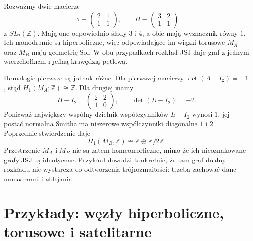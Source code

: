 \begin{przyklad}
\label{ex:tg-jsj-same-graph-different-h1}
Rozważmy dwie macierze
\[
A=\begin{pmatrix}2&1\\1&1\end{pmatrix},
\qquad
B=\begin{pmatrix}3&2\\1&1\end{pmatrix}
\]
z $SL_2(\mathbb Z)$.
Mają one odpowiednio ślady $3$ i $4$,
a obie mają wyznacznik równy $1$.
Ich monodromie są hiperboliczne,
więc odpowiadające im wiązki torusowe
$M_A$ oraz $M_B$ mają geometrię Sol.
W obu przypadkach rozkład JSJ
daje graf z jednym wierzchołkiem
i jedną krawędzią pętlową.

Homologie pierwsze są jednak różne.
Dla pierwszej macierzy $\det(A-I_2)=-1$,
stąd $H_1(M_A;\mathbb Z)\cong\mathbb Z$.
Dla drugiej mamy
\[
B-I_2=\begin{pmatrix}2&2\\1&0\end{pmatrix},
\qquad
\det(B-I_2)=-2.
\]
Ponieważ największy wspólny dzielnik
współczynników $B-I_2$ wynosi $1$,
jej postać normalna Smitha ma
niezerowe współczynniki diagonalne
$1$ i $2$. Poprzednie stwierdzenie daje
\[
H_1(M_B;\mathbb Z)\cong
\mathbb Z\oplus\mathbb Z/2\mathbb Z.
\]
Przestrzenie $M_A$ i $M_B$ nie są
zatem homeomorficzne, mimo że
ich nieoznakowane grafy JSJ są identyczne.
Przykład dowodzi konkretnie,
że sam graf dualny rozkładu
nie wystarcza do odtworzenia
trójrozmaitości: trzeba zachować
dane monodromii i sklejania.
\end{przyklad}

\section{Przykłady: węzły hiperboliczne, torusowe i satelitarne}
\label{sec:tg-jsj-knots}


